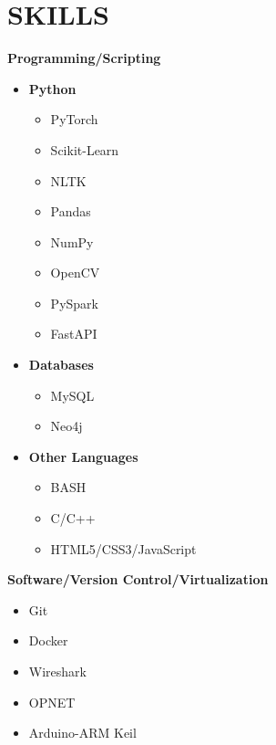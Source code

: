 \documentclass[11pt,a4paper,sans]{moderncv} %
\begin{document}
\section{SKILLS}

\begin{multicols}{2}
    \textbf{\large Programming/Scripting} 
    \begin{itemize}
        \item \textbf{Python}
        \begin{itemize}
            \item PyTorch
            \item Scikit-Learn
            \item NLTK
            \item Pandas
            \item NumPy
            \item OpenCV
            \item PySpark
            \item FastAPI
        \end{itemize}
        \item \textbf{Databases}
        \begin{itemize}
            \item MySQL
            \item Neo4j
        \end{itemize}
        \item \textbf{Other Languages}
        \begin{itemize}
            \item BASH
            \item C/C++
            \item HTML5/CSS3/JavaScript
        \end{itemize}
    \end{itemize}
    
    \textbf{\large Software/Version Control/Virtualization} 
    \begin{itemize}
        \item Git
        \item Docker
        \item Wireshark
        \item OPNET
        \item Arduino-ARM Keil
    \end{itemize}
\end{multicols}
\end{document}
